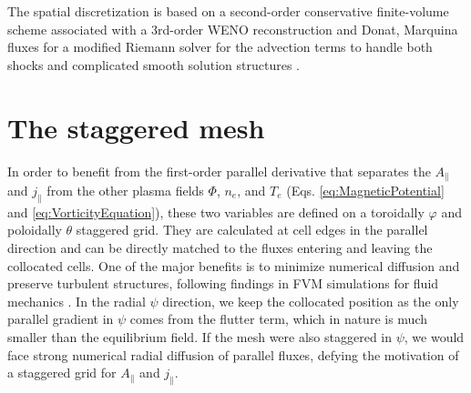The spatial discretization is based on a second-order conservative finite-volume scheme associated with a 3rd-order WENO reconstruction and Donat, Marquina fluxes for a modified Riemann solver for the advection terms to handle both shocks and complicated smooth solution structures \cite{tamain2016tokam3x, Bufferand2021}. \newline




\section{The staggered mesh}

In order to benefit from the first-order parallel derivative that separates the $A_\parallel$ and $j_\parallel$ from the other plasma fields $\Phi$, $n_e$, and $T_e$ (Eqs. \ref{eq:MagneticPotential} and \ref{eq:VorticityEquation}), these two variables are defined on a toroidally $\varphi$ and poloidally $\theta$ staggered grid. They are calculated at cell edges in the parallel direction and can be directly matched to the fluxes entering and leaving the collocated cells. One of the major benefits is to minimize numerical diffusion and preserve turbulent structures, following findings in FVM simulations for fluid mechanics \cite{meier1999comparison}. In the radial $\psi$ direction, we keep the collocated position as the only parallel gradient in $\psi$ comes from the flutter term, which in nature is much smaller than the equilibrium field. If the mesh were also staggered in $\psi$, we would face strong numerical radial diffusion of parallel fluxes, defying the motivation of a staggered grid for $A_\parallel$ and $j_\parallel$. \newline


